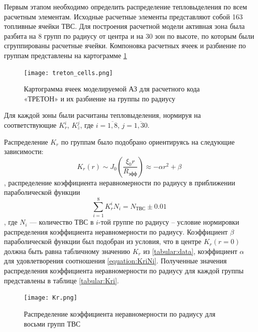 Первым этапом необходимо определить распределение тепловыделения по всем расчетным элементам. Исходные расчетные элементы представляют собой 163 топливные ячейки ТВС. Для построения расчетной модели активная зона была разбита на 8 групп по радиусу от центра и на 30 зон по высоте, по которым были сгруппированы расчетные ячейки. Компоновка расчетных ячеек и разбиение по группам представлены на картограмме \ref{pic:treton-kartogramma}


\begin{figure}[H]
	\begin{center}
		\texttt{[image: treton\_cells.png]}
		\caption{Картограмма ячеек моделируемой АЗ для расчетного кода «ТРЕТОН» 
				 и их разбиение на группы по радиусу}
		\label{pic:treton-kartogramma}
	\end{center}
\end{figure}


Для каждой зоны были расчитаны тепловыделения, нормируя на соответствующие $K_r^i$, $K_z^j$, где $i = \overline{1, 8}$, $j = \overline {1, 30}$.

Распределение $K_r$ по группам было подобрано ориентируясь на следующие зависимости:
\begin{equation}
    K_r(r) \sim J_0(\frac{\xi_0 r}{R_{\text{эфф}}}) \approx - \alpha r^2 + \beta
\end{equation}, распределение коэффициента неравномерности по радиусу в приближении параболической функции
\begin{equation}
    \label{equation:KriNi}
    \sum_{i=1}^{8} K_r^i N_i = N_{\text{ТВС}} \pm 0.01
\end{equation}, где $N_i$ — количество ТВС в $i$-той группе по радиусу – условие нормировки распределения коэффициента неравномерности по радиусу.
Коэффициент $\beta$ параболической функции был подобран из условия, что в центре $K_r(r=0)$ должна быть равна табличному значению $K_r$ из \ref{tabular:data}, коэффициент $\alpha$ для удовлетворения соотношения \ref{equation:KriNi}. Полученные значения распределения коэффициента неравномерности по радиусу для каждой группы представлены в таблице \ref{tabular:Kri}.

\begin{figure}[H]
	\begin{center}
		\texttt{[image: Kr.png]}
		\caption{Распределение коэффициента неравномерности по радиусу для восьми групп ТВС}
		\label{pic:Kr}
	\end{center}
\end{figure}

